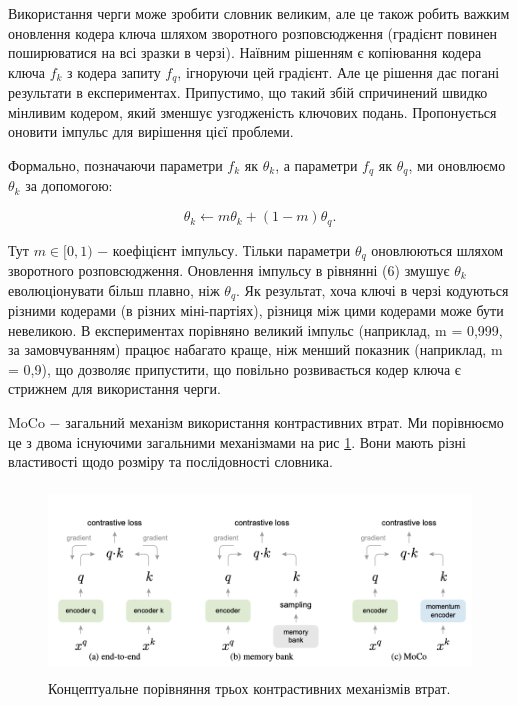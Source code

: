 Використання черги може зробити словник великим, але це також робить важким оновлення кодера ключа шляхом зворотного розповсюдження (градієнт повинен поширюватися на всі зразки в черзі). Наївним рішенням є копіювання кодера ключа $f_{k}$ з кодера запиту $f_{q}$, ігноруючи цей градієнт. Але це рішення дає погані результати в експериментах. Припустимо, що такий збій спричинений швидко мінливим кодером, який зменшує узгодженість ключових подань. Пропонується оновити імпульс для вирішення цієї проблеми.

Формально, позначаючи параметри $f_{k}$ як $\theta_{k}$, а параметри $f_{q}$ як $\theta_{q}$, ми оновлюємо $\theta_{k}$ за допомогою:

\begin{equation}\label{eq:theta_opt}
\theta_{k} \leftarrow m\theta_{k} + (1 - m)\theta_{q}.
\end{equation}

\vspace{1.5em}

Тут $m \in [0, 1)$ $-$ коефіцієнт імпульсу. Тільки параметри $\theta_{q}$ оновлюються шляхом зворотного розповсюдження. Оновлення імпульсу в рівнянні (6) змушує $\theta_{k}$ еволюціонувати більш плавно, ніж $\theta_{q}$. Як результат, хоча ключі в черзі кодуються різними кодерами (в різних міні-партіях), різниця між цими кодерами може бути невеликою. В експериментах порівняно великий імпульс (наприклад, m = 0,999, за замовчуванням) працює набагато краще, ніж менший показник (наприклад, m = 0,9), що дозволяє припустити, що повільно розвивається кодер ключа є стрижнем для використання черги.

MoCo $-$ загальний механізм використання контрастивних втрат. Ми порівнюємо це з двома існуючими загальними механізмами на рис \ref{fig:momentum1}. Вони мають різні властивості щодо розміру та послідовності словника.

\newpage

\vspace{1em}

\begin{figure}[h]
  \includegraphics[width=\textwidth, height=5cm, natwidth=474, natheight=193]{Mal/momentum1.jpg}
  \caption{Концептуальне порівняння трьох контрастивних механізмів втрат.}
  \label{fig:momentum1}
\end{figure}

